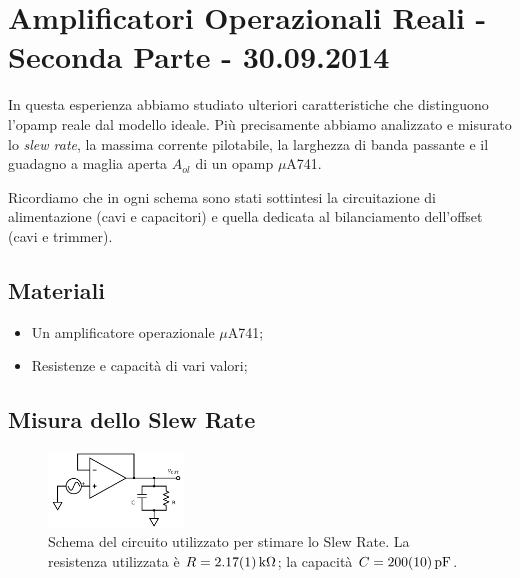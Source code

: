 \section{Amplificatori Operazionali Reali - Seconda Parte - 30.09.2014}

In questa esperienza abbiamo studiato ulteriori caratteristiche che distinguono l'opamp reale dal modello ideale.
Più precisamente abbiamo analizzato e misurato lo \textit{slew rate}, la massima corrente pilotabile, la larghezza di banda passante e il guadagno a maglia aperta $A_{ol}$ di un opamp $\mu$A741.

Ricordiamo che in ogni schema sono stati sottintesi la circuitazione di alimentazione (cavi e capacitori) e quella dedicata al bilanciamento dell'offset (cavi e trimmer).

\subsection*{Materiali}

\begin{itemize} [noitemsep]
\item Un amplificatore operazionale $\mu$A741;
\item Resistenze e capacità di vari valori;
\end{itemize}

\subsection{Misura dello Slew Rate}

\begin{figure}
  \begin{center}
    \includegraphics[width=0.32\textwidth]{../E03/latex/slew_rate.pdf}
  \end{center}
  \caption{Schema del circuito utilizzato per stimare lo Slew Rate. La resistenza utilizzata è $R=\SI{2.17\pm0.01}{\kilo\ohm}$; la capacità $C=\SI{200 \pm 10}{\pF}$.}
  \label{cir3:slew_rate}
\end{figure}

